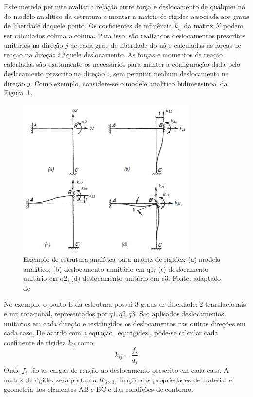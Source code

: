 Este método permite avaliar a relação entre força e deslocamento de qualquer nó
do modelo analítico da estrutura e montar a matriz de rigidez associada aos
graus de liberdade daquele ponto. Os coeficientes de influência $k_{ij}$ da
matriz $K$ podem ser calculados coluna a coluna. Para isso, são realizados
deslocamentos prescritos unitários na direção $j$ de cada grau de liberdade do
nó e calculadas as forças de reação na direção $i$ àquele deslocamento. As
forças e momentos de reação calculadas são exatamente os necessários para manter
a configuração dada pelo deslocamento prescrito na direção $i$, sem permitir
nenhum deslocamento na direção $j$. Como exemplo, considere-se o modelo
analítico bidimensinoal da Figura~\ref{fig::ex_stiff_analitico}.

\begin{figure}[h]
	\centering 
 	\includegraphics[width=0.80\textwidth]{figs/ex_stiff_analitico}
 	\caption[Exemplo de estrutura analítica para matriz de rigidez]{Exemplo de estrutura
 	analítica para matriz de rigidez: (a)
 	modelo analítico; (b) deslocamento unnitário em q1; (c) deslocamento
 	unitário em q2; (d) deslocamento unitário em q3. Fonte:
 	adaptado de \cite{weaver2012matrix}}
 	\label{fig::ex_stiff_analitico}
\end{figure}

No exemplo, o ponto B da estrutura possui 3 graus de liberdade: 2 translacionais
e um rotacional, representados por $q1, q2, q3$. São aplicados deslocamentos
unitários em cada direção e restringidos os deslocamentos nas outras direções em
cada caso. De acordo com a equação~\ref{eq::rigidez}, pode-se calcular cada
coeficiente de rigidez $k_{ij}$ como:
%
\begin{equation}
	k_{ij} = \frac{f_i}{q_j}
\end{equation}
%
Onde $f_i$ são as cargas de reação ao deslocamento prescrito em cada caso. A
matriz de rigidez será portanto $K_{3\times3}$, função das propriedades de
material e geometria dos elementos AB e BC e das condições de contorno.

